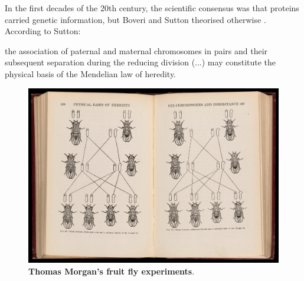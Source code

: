 


In the first decades of the 20th century, the scientific consensus was that proteins carried genetic information, but Boveri and Sutton theorised otherwise \cite{dahm:2005wx,sutton:1902tx}. According to Sutton:

\begin{displayquote}
the association of paternal and maternal chromosomes in pairs and their subsequent separation during the reducing division (...) may constitute the physical basis of the Mendelian law of heredity.
\end{displayquote}


\begin{figure}
  \vspace{-\intextsep}
  \includegraphics[width=\linewidth]{images/intro/thomas-morgan-fly}
  \caption[Thomas Morgan's fruit fly experiments]{\textbf{Thomas Morgan's fruit fly experiments}.}
  \vspace{-\intextsep}
\end{figure}

